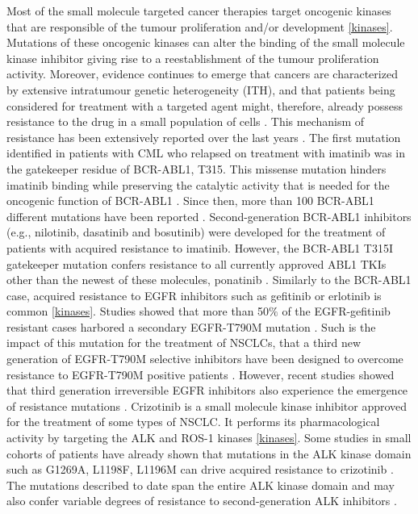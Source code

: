 \documentclass[12pt, b5paper,twoside]{tesi_upf}
\begin{document}
\par Most of the small molecule targeted cancer therapies target oncogenic kinases that are responsible of the tumour proliferation and/or development \ref{kinases}. Mutations of these oncogenic kinases can alter the binding of the small molecule kinase inhibitor giving rise to a reestablishment of the tumour proliferation activity. Moreover, evidence continues to emerge that cancers are characterized by extensive intratumour genetic heterogeneity (ITH), and that patients being considered for treatment with a targeted agent might, therefore, already possess resistance to the drug in a small population of cells \cite{Schmitt2015}. This mechanism of resistance has been extensively reported over the last years \cite{Chen2011, Barouch-Bentov2011a}. The first mutation identified in patients with CML who relapsed on treatment with imatinib was in the gatekeeper residue of BCR-ABL1, T315. This missense  mutation hinders imatinib binding while preserving the catalytic activity that is needed for the oncogenic function of BCR-ABL1 \cite{Gorre2001}. Since then, more than 100 BCR-ABL1 different mutations have been reported \cite{Soverini2016}. Second-generation BCR-ABL1 inhibitors (e.g., nilotinib, dasatinib and bosutinib) were developed for the treatment of patients with acquired resistance to imatinib. However, the BCR-ABL1 T315I gatekeeper mutation confers resistance to all currently approved ABL1 TKIs other than the newest of these molecules, ponatinib \cite{Soverini2016}. Similarly to the BCR-ABL1 case, acquired resistance to EGFR inhibitors such as gefitinib or erlotinib is common \ref{kinases}. Studies showed that more than 50$\%$ of the EGFR-gefitinib resistant cases harbored a secondary EGFR-T790M mutation \cite{Shih2005}. Such is the impact of this mutation for the treatment of NSCLCs, that a third new generation of EGFR-T790M selective inhibitors have been designed to overcome resistance to EGFR-T790M positive patients \cite{Walter2013, Cross2014}. However, recent studies showed that third generation irreversible EGFR inhibitors also experience the emergence of resistance mutations \cite{Ercan2015}. Crizotinib is a small molecule kinase inhibitor approved for the treatment of some types of NSCLC. It performs its pharmacological activity by targeting the ALK and ROS-1 kinases \ref{kinases}. Some studies in small cohorts of patients have already shown that mutations in the ALK kinase domain such as G1269A, L1198F, L1196M can drive acquired resistance to crizotinib \cite{Doebele2012, Shaw2015}. The mutations described to date span the entire ALK kinase domain and may also confer variable degrees of resistance to second-generation ALK inhibitors \cite{Wu2016}. 
\end{document}
